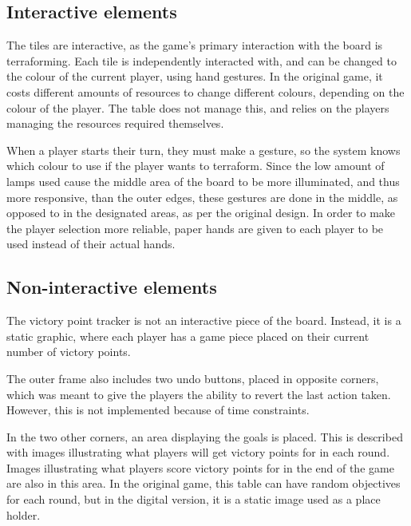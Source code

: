 \subsection{Interactive elements}
The tiles are interactive, as the game's primary interaction with the board is terraforming. Each tile is independently interacted with, and can be changed to the colour of the current player, using hand gestures. In the original game, it costs different amounts of resources to change different colours, depending on the colour of the player. The table does not manage this, and relies on the players managing the resources required themselves.

When a player starts their turn, they must make a gesture, so the system knows which colour to use if the player wants to terraform. Since the low amount of lamps used cause the middle area of the board to be more illuminated, and thus more responsive, than the outer edges, these gestures are done in the middle, as opposed to in the designated areas, as per the original design. In order to make the player selection more reliable, paper hands are given to each player to be used instead of their actual hands.

\subsection{Non-interactive elements}
The victory point tracker is not an interactive piece of the board. Instead, it is a static graphic, where each player has a game piece placed on their current number of victory points.

The outer frame also includes two undo buttons, placed in opposite corners, which was meant to give the players the ability to revert the last action taken. However, this is not implemented because of time constraints.

In the two other corners, an area displaying  the goals is placed. This is described with images illustrating what players will get victory points for in each round. Images illustrating what players score victory points for in the end of the game are also in this area. In the original game, this table can have random objectives for each round, but in the digital version, it is a static image used as a place holder.